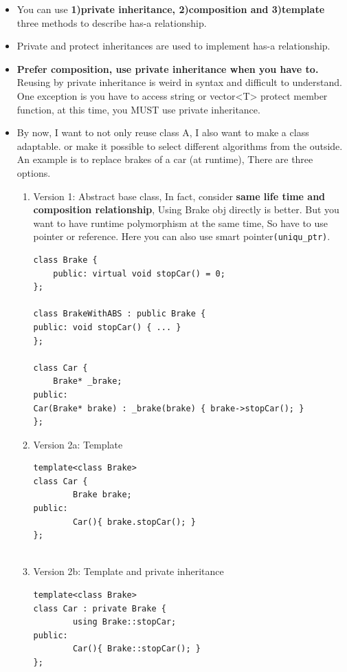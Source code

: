 \documentclass[a4paper,11pt,twoside]{book}
\begin{document}
\begin{itemize}
	\item You can use \textbf{1)private inheritance, 2)composition and 3)template} three methods to describe has-a relationship.
	
	\item Private and protect inheritances are used to implement has-a relationship. 

	\item \textbf{Prefer composition, use private inheritance when you have to.} Reusing by private inheritance is weird in syntax and difficult to understand. One exception is you have to access string or vector<T> protect member function, at this time, you MUST use private inheritance.
	
	\item By now, I want to not only reuse class A, I also want to make a class adaptable. or make it possible to select different algorithms from the outside.  An example is  to replace brakes of a car (at runtime), There are three options.
	\begin{enumerate}
		\item Version 1: Abstract base class, In fact, consider \textbf{same life time and composition relationship},  Using Brake obj directly is better. But you want to have runtime polymorphism at the same time, So have to use pointer or reference. Here you can also use smart pointer\texttt{(uniqu\_ptr)}.
\begin{lstlisting}[numbers=none]
class Brake {
	public: virtual void stopCar() = 0;
};
		
class BrakeWithABS : public Brake {
public: void stopCar() { ... }
};
		
class Car {
	Brake* _brake;
public:
Car(Brake* brake) : _brake(brake) { brake->stopCar(); }
};
\end{lstlisting}
		
		\item Version 2a: Template
		
\begin{lstlisting}[numbers=none]
template<class Brake>
class Car {
		Brake brake;
public:
		Car(){ brake.stopCar(); }
};
		
\end{lstlisting}
		\item Version 2b: Template and private inheritance
\begin{lstlisting}[numbers=none]
template<class Brake>
class Car : private Brake {
		using Brake::stopCar;
public:
		Car(){ Brake::stopCar(); }
};
\end{lstlisting}
	\end{enumerate}
	

\end{itemize}
\end{document}
